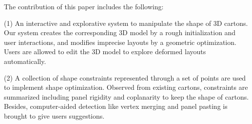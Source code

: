 The contribution of this paper includes the following:

(1) An interactive and explorative system to manipulate the shape of 3D cartons. Our system creates the corresponding 3D model by a rough initialization and user interactions, and modifies imprecise layouts by a geometric optimization. Users are allowed to edit the 3D model to explore deformed layouts automatically.

(2) A collection of shape constraints represented through a set of points are used to implement shape optimization. Observed from existing cartons, constraints are summarized including panel rigidity and coplanarity to keep the shape of cartons. Besides, computer-aided detection like vertex merging and panel pasting is brought to give users suggestions. 